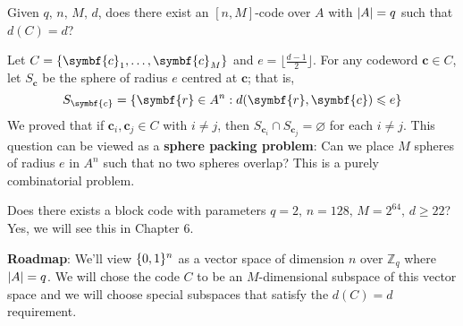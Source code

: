 Given $ q,\,n,\,M,\,d $, does there exist an $ [n,M] $-code over $ A $
with $ \lvert A\rvert=q $ such that $ d(C)=d $?

Let $ C=\set{\symbf{c}_1,\ldots ,\symbf{c}_M} $ and $ e=\lfloor \frac{d-1}{2} \rfloor $.
For any codeword $ \symbf{c}\in C $, let $ S_{\symbf{c}} $ be the sphere of radius $ e $ centred at
$ \symbf{c} $;
that is,
\[ S_{\symbf{c}}= \set{\symbf{r}\in A^n:d(\symbf{r},\symbf{c})\leqslant e} \]
We proved that if $ \symbf{c}_i,\symbf{c}_j\in C $ with $ i\neq j $,
then $ S_{\symbf{c}_i}\cap S_{\symbf{c}_j}= \varnothing $ for each $ i\neq j $.
This question can be viewed as a \textbf{sphere packing problem}:
Can we place $ M $ spheres of radius $ e $ in $ A^n $ such that
no two spheres overlap? This is a purely combinatorial problem.

Does there exists a block code with parameters
$ q=2,\,n=128,\,M=2^{64},\,d\geqslant 22 $? Yes, we will see this in Chapter 6.

\textbf{Roadmap}: We'll view $ \{0,1\}^{n} $ as a vector space of
dimension $ n $ over $ \mathbb{Z}_q $ where $ \lvert A\rvert=q $. We will chose the code
$ C $ to be an $ M $-dimensional subspace of this vector space
and we will choose special subspaces that satisfy the $ d(C)=d $ requirement.
